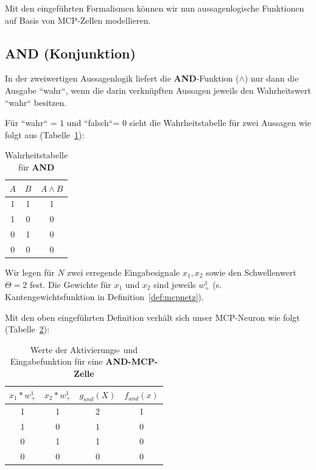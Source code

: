 Mit den eingeführten Formalismen können wir nun aussagenlogische Funktionen auf Basis von MCP-Zellen modellieren.


\subsection*{AND (Konjunktion)}
In der zweiwertigen Aussagenlogik liefert die \textbf{AND}-Funktion ($\land$) nur dann die Ausgabe ``wahr``, wenn die darin verknüpften Aussagen jeweils den Wahrheitswert ``wahr`` besitzen.

Für ``wahr`` = $1$ und ``falsch``= $0$ sieht die Wahrheitstabelle für zwei Aussagen wie folgt aus (Tabelle~\ref{tab:and}):

\setlength{\tabcolsep}{1.5em}
{\renewcommand{\arraystretch}{1.5}%
\begin{table} %
    \centering
    \begin{tabular}{c | c | c }
        \textbf{$A$} & \textbf{$B$} & \textbf{$A \land B$} \\
        \hline
        1  & 1 & 1 \\
        1  & 0 & 0 \\
        0  & 1 & 0 \\
        0  & 0 & 0 \\
    \end{tabular}
    \caption{Wahrheitstabelle für \textbf{AND}}
    \label{tab:and}
\end{table}



Wir legen für $N$ zwei erregende Eingabesignale $x_1, x_2$ sowie den Schwellenwert $\Theta = 2$ fest. Die Gewichte für $x_1$ und $x_2$ sind jeweils $w^1_+$ (s. Kantengewichtsfunktion in Definition~\ref{def:mcpnetz}).

Mit den oben eingeführten Definition verhält sich unser MCP-Neuron wie folgt (Tabelle~\ref{tab:mcp-and}):

\begin{table} %
    \centering
    \begin{tabular}{c | c | c |c }
        $x_1*w^1_+$ & $x_2*w^1_+$ & $g_{and}(X)$ & $f_{and}(x)$ \\
        \hline
        1     & 1     & 2      &   1   \\
        1     & 0     & 1      &   0   \\
        0     & 1     & 1      &   0   \\
        0     & 0     & 0      &   0   \\
    \end{tabular}
    \caption{Werte der Aktivierungs- und Eingabefunktion für eine \textbf{AND-MCP-Zelle}}
    \label{tab:mcp-and}
\end{table}


}
